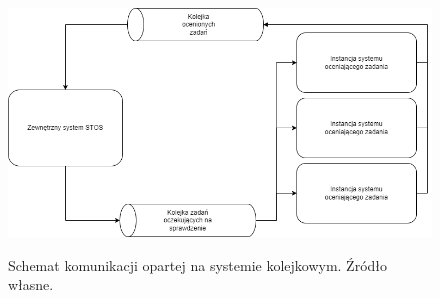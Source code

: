 \begin{figure}[!ht]
	\begin{center}
		\resizebox{1.0\textwidth}{!} {
			\includegraphics{img/5/system-kolejkowy.png}
		}
		\caption[Schemat komunikacji opartej na systemie kolejkowym. Źródło własne.]{Schemat komunikacji opartej na systemie kolejkowym. Źródło własne.}
    \label{stos-queue}
	\end{center}
\end{figure}
